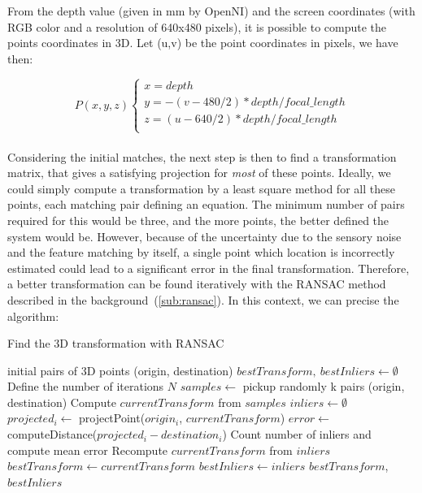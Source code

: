 From the depth value (given in mm by OpenNI) and the screen coordinates (with RGB color and a resolution of 640x480 pixels), it is possible to compute the points coordinates in 3D. Let (u,v) be the point coordinates in pixels, we have then:

\[
P(x,y,z)\left\{
\begin{array}{l}
x = depth \\
y = -(v - 480/2) * depth / focal\_length \\
z = (u - 640/2) * depth / focal\_length \\
\end{array}
\right.
\]

\paragraph{}
Considering the initial matches, the next step is then to find a transformation matrix, that gives a satisfying projection for \emph{most} of these points. Ideally, we could simply compute a transformation by a least square method for all these points, each matching pair defining an equation. The minimum number of pairs required for this would be three, and the more points, the better defined the system would be. However, because of the uncertainty due to the sensory noise and the feature matching by itself, a single point which location is incorrectly estimated could lead to a significant error in the final transformation. Therefore, a better transformation can be found iteratively with the \gls{RANSAC} method described in the background~(\ref{sub:ransac}). In this context, we can precise the algorithm:

\begin{algorithm}[H]
\caption{Find the 3D transformation with RANSAC}
\begin{algorithmic}
\REQUIRE initial pairs of 3D points (origin, destination)
\STATE $bestTransform,\:bestInliers \gets \emptyset$
\STATE Define the number of iterations $N$
 \STATE $samples \gets$ pickup randomly k pairs (origin, destination)
 \STATE Compute $currentTransform$ from $samples$
 \STATE $inliers \gets \emptyset$
  \STATE $projected_i \gets$ projectPoint($origin_i$, $currentTransform$)
  \STATE $error \gets$ computeDistance($projected_i - destination_i$)
  \ENDIF
 \ENDFOR
 \STATE Count number of inliers and compute mean error
  \STATE Recompute $currentTransform$ from $inliers$
   \STATE $bestTransform \gets currentTransform$
   \STATE $bestInliers \gets inliers$
  \ENDIF
 \ENDIF
\ENDFOR
\RETURN $bestTransform$, $bestInliers$
\end{algorithmic}
\end{algorithm}

